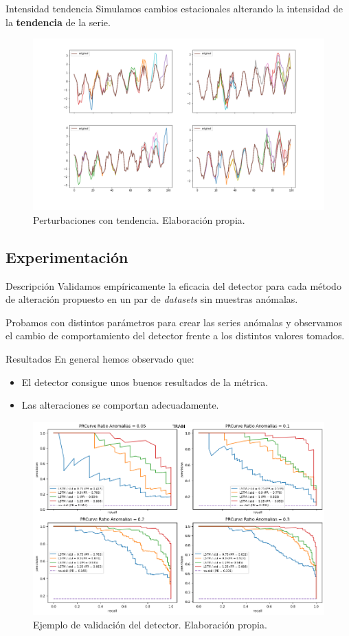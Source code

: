 \documentclass[spanish]{beamer}
\begin{document}
\begin{frame}{Intensidad tendencia}
  Simulamos cambios estacionales alterando la intensidad de la \textbf{tendencia} de la serie.

  \begin{figure}
    \centering
    \includegraphics[width=.92\linewidth]{img/tendencia}
    \caption{Perturbaciones con tendencia. Elaboración propia.}
  \end{figure}
\end{frame}

\subsection{Experimentación}

\begin{frame}{Descripción}
  Validamos empíricamente la eficacia del detector para cada método de alteración propuesto en un par de \emph{datasets} sin muestras anómalas.
  \pause

  Probamos con distintos parámetros para crear las series anómalas y observamos el cambio de comportamiento del detector frente a los distintos valores tomados.
\end{frame}

\begin{frame}{Resultados}
  En general hemos observado que:
  \begin{itemize}
    \item El detector consigue unos buenos resultados de la métrica.
    \item Las alteraciones se comportan adecuadamente.
  \end{itemize}

  \begin{figure}
    \centering
    \includegraphics[width=.68\linewidth]{img/validacion}
    \caption{Ejemplo de validación del detector. Elaboración propia.}
  \end{figure}
\end{frame}
\end{document}
